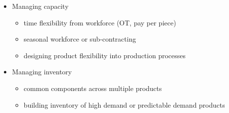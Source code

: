 \documentclass[10pt,handout,notes=show]{beamer}
\begin{document}
\begin{frame}
{    \begin{itemize}
    \item Managing capacity
    \begin{itemize}
      \item time flexibility from workforce (OT, pay per piece)
      \item seasonal workforce or sub-contracting
      \item designing product flexibility into production processes \NextHalfLine
    \end{itemize}
    \item Managing inventory
    \begin{itemize}
      \item common components across multiple products
      \item building inventory of high demand or predictable demand products
    \end{itemize}
  \end{itemize}

  }
\end{frame}
\end{document}

